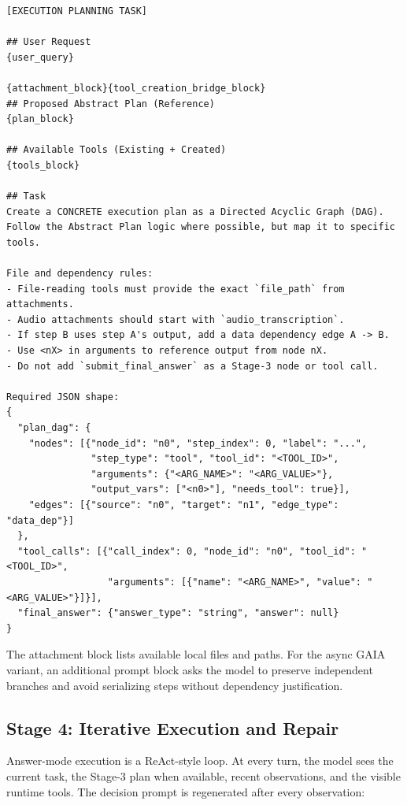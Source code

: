 \documentclass{article}
\begin{document}
\begin{lstlisting}
[EXECUTION PLANNING TASK]

## User Request
{user_query}

{attachment_block}{tool_creation_bridge_block}
## Proposed Abstract Plan (Reference)
{plan_block}

## Available Tools (Existing + Created)
{tools_block}

## Task
Create a CONCRETE execution plan as a Directed Acyclic Graph (DAG).
Follow the Abstract Plan logic where possible, but map it to specific tools.

File and dependency rules:
- File-reading tools must provide the exact `file_path` from attachments.
- Audio attachments should start with `audio_transcription`.
- If step B uses step A's output, add a data dependency edge A -> B.
- Use <nX> in arguments to reference output from node nX.
- Do not add `submit_final_answer` as a Stage-3 node or tool call.

Required JSON shape:
{
  "plan_dag": {
    "nodes": [{"node_id": "n0", "step_index": 0, "label": "...",
               "step_type": "tool", "tool_id": "<TOOL_ID>",
               "arguments": {"<ARG_NAME>": "<ARG_VALUE>"},
               "output_vars": ["<n0>"], "needs_tool": true}],
    "edges": [{"source": "n0", "target": "n1", "edge_type": "data_dep"}]
  },
  "tool_calls": [{"call_index": 0, "node_id": "n0", "tool_id": "<TOOL_ID>",
                  "arguments": [{"name": "<ARG_NAME>", "value": "<ARG_VALUE>"}]}],
  "final_answer": {"answer_type": "string", "answer": null}
}
\end{lstlisting}

The attachment block lists available local files and paths. For the async GAIA
variant, an additional prompt block asks the model to preserve independent
branches and avoid serializing steps without dependency justification.

\subsection{Stage 4: Iterative Execution and Repair}
\label{subsec:appendix-stage4}

Answer-mode execution is a ReAct-style loop. At every turn, the model sees the
current task, the Stage-3 plan when available, recent observations, and the
visible runtime tools. The decision prompt is regenerated after every
observation:
\end{document}
